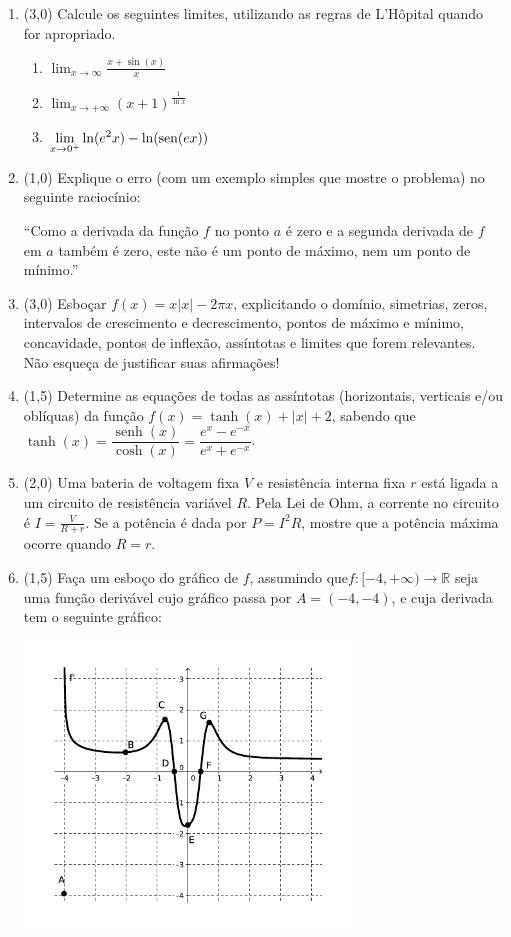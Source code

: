 \documentclass[12pt,a4paper]{article}
\newcommand*\sen{\operatorname{sen}}
\newcommand*\senh{\operatorname{senh}}
\newcommand*\abs[1]{\left|#1\right|}
\newcommand*\R{\mathbb{R}}
\begin{document}
\begin{enumerate}

\item (3,0) Calcule os seguintes limites, utilizando as regras de L'Hôpital quando for apropriado.
\begin{multicols}{3}
\begin{enumerate}
\item $\displaystyle\lim_{x\to\infty} \frac{x+\sin(x)}{x}$
\item $\displaystyle\lim_{x\to +\infty} (x+1)^{\frac{1}{\ln{x}}}$
\item \footnotesize $\displaystyle\lim_{x\to 0^+} \ln(e^2 x)\nolinebreak-\nolinebreak\ln(\sen(e x))$
\end{enumerate}
\end{multicols}

\item (1,0) Explique o erro (com um exemplo simples que mostre o problema) no seguinte raciocínio:

``Como a derivada da função $f$ no ponto $a$ é zero e a segunda derivada de $f$ em $a$ também é zero, este não é um ponto de máximo, nem um ponto de mínimo.''

\item (3,0) Esboçar $f(x) = x\abs{x} - 2\pi x$, explicitando o domínio, simetrias, zeros, intervalos de crescimento e decrescimento, pontos de máximo e mínimo, concavidade, pontos de inflexão, assíntotas e limites que forem relevantes. Não esqueça de justificar suas afirmações!

\item (1,5) Determine as equações de todas as assíntotas (horizontais, verticais e/ou oblíquas) da função $f(x) = \tanh(x) + \abs{x} + 2$, sabendo que $\tanh(x) = \dfrac{\senh(x)}{\cosh(x)} =  \dfrac{e^x - e^{-x}}{e^x + e^{-x}}$.

\item (2,0) Uma bateria de voltagem fixa $V$ e resistência interna fixa $r$ está ligada a um circuito de resistência variável $R$. Pela Lei de Ohm, a corrente no circuito é $I = \frac{V}{R+r}$. Se a potência é dada por $P = I^2R$, mostre que a potência máxima ocorre quando $R = r$.

\item (1,5) Faça um esboço do gráfico de $f$, assumindo que$f: [-4, +\infty) \to \R$ seja uma função derivável cujo gráfico passa por $A=(-4,-4)$, e cuja derivada tem o seguinte gráfico:

\includegraphics[width=8.7cm]{img/prova-3-ele-grafico-f'}


\end{enumerate}
\end{document}
